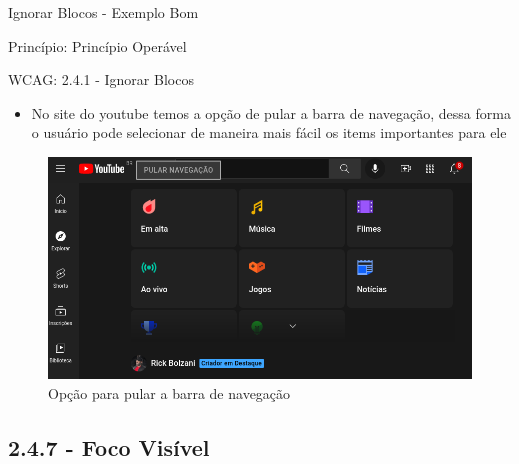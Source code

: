 \documentclass{beamer}
\begin{document}
\begin{frame}{Ignorar Blocos - Exemplo Bom}

Princípio: Princípio Operável

WCAG: 2.4.1 - Ignorar Blocos

\begin{itemize}
	\item No site do youtube temos a opção de pular a barra de navegação, dessa forma o usuário pode selecionar de maneira mais fácil os items importantes para ele
\end{itemize}
\begin{figure}
    \centering
    \includegraphics[scale=0.2]{images/keyboard1.png}
    \caption{Opção para pular a barra de navegação}
\end{figure}

\end{frame}

\subsection{2.4.7 - Foco Visível}
\end{document}
